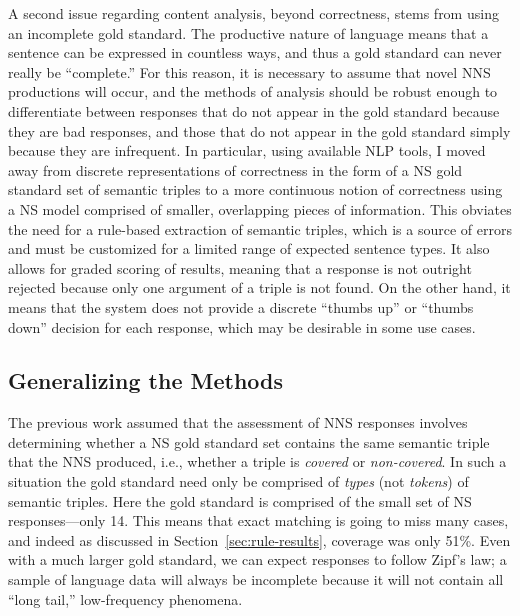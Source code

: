 A second issue regarding content analysis, beyond correctness, stems
from using an incomplete gold standard. The productive nature of language means that a sentence can be expressed in countless ways, and thus a gold standard can never really be ``complete.'' For this reason, it is necessary to assume that novel NNS productions will occur, and the methods of analysis should be robust enough to differentiate between responses that do not appear in the gold standard because they are bad responses, and those that do not appear in the gold standard simply because they are infrequent.
In particular, using available NLP tools, I moved away from discrete representations of correctness in the form of a NS gold standard set of semantic triples to a more continuous notion of correctness using a NS model comprised of smaller, overlapping pieces of information. This obviates the need for a rule-based extraction of semantic triples, which is a source of errors and must be customized for a limited range of expected sentence types. It also allows for graded scoring of results, meaning that a response is not outright rejected because only one argument of a triple is not found. On the other hand, it means that the system does not provide a discrete ``thumbs up'' or ``thumbs down'' decision for each response, which may be desirable in some use cases.


\subsection{Generalizing the Methods}
\label{sec:ranking}

The previous work assumed that the assessment of NNS responses
involves determining whether a NS gold standard set contains the same
semantic triple that the NNS produced, i.e., whether a triple
is \textit{covered} or \textit{non-covered}.  In such a situation the
gold standard need only be comprised of \textit{types} (not \textit{tokens}) of semantic triples. Here the gold standard is comprised of the small set of NS responses---only 14. This means that exact matching is going to miss many cases,
and indeed as discussed in Section~\ref{sec:rule-results}, coverage was only 51\%. Even with a much larger gold standard, we can expect responses to follow Zipf's law; a sample of language data will always be incomplete because it will not contain all ``long tail,'' low-frequency phenomena.

